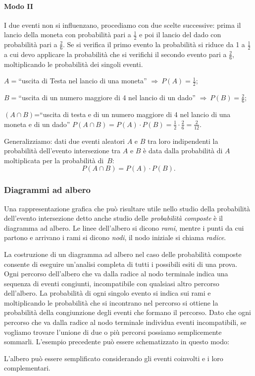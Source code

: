 \begin{exrig}
\begin{esempio}
\paragraph{Modo II} I due eventi non si influenzano, procediamo con due scelte successive: prima il lancio della moneta con probabilità pari a $\frac 1 2$ e poi il lancio del dado con probabilità pari a $\frac 2 6$. Se si verifica il primo evento la probabilità si riduce da 1 a $\frac 1 2$ a cui devo applicare la probabilità che si verifichi il secondo evento pari a $\frac 2 6$, moltiplicando le probabilità dei singoli eventi.
\begin{description*}
\item $A=$``uscita di Testa nel lancio di una moneta'' $\Rightarrow\: P(A)=\frac 1 2$;
\item $B=$``uscita di un numero maggiore di 4 nel lancio di un dado'' $\Rightarrow\: P(B)=\frac 2 6$;
\item $(A\cap B)$=``uscita di testa e di un numero maggiore di 4 nel lancio di una moneta e di un dado'' $P(A\cap B)=P(A)\cdot P(B)=\frac 1 2\cdot \frac 2 6=\frac 2{12}$.
\end{description*}
\end{esempio}
\end{exrig}

Generalizziamo: dati due eventi aleatori $A$ e $B$ tra loro indipendenti la probabilità dell'evento intersezione tra $A$ e $B$ è data dalla probabilità di $A$ moltiplicata per la probabilità di~$B$: \[P(A\cap B)=P(A)\cdot P(B).\]\label{reg:probabilita_intersezione_eventi_indipendenti}

\subsubsection*{Diagrammi ad albero}
Una rappresentazione grafica che può risultare utile nello studio della probabilità dell'evento intersezione detto anche studio delle \emph{probabilità composte} è il diagramma ad albero. Le linee dell'albero si dicono \emph{rami}, mentre i punti da cui partono e arrivano i rami si dicono \emph{nodi}, il nodo iniziale si chiama \emph{radice}.

La costruzione di un diagramma ad albero nel caso delle probabilità composte consente di eseguire un'analisi completa di tutti i possibili esiti di una prova. Ogni percorso dell'albero che va dalla radice al nodo terminale indica una sequenza di eventi congiunti, incompatibile con qualsiasi altro percorso dell'albero. La probabilità di ogni singolo evento si indica sui rami e moltiplicando le probabilità che si incontrano nel percorso si ottiene la probabilità della congiunzione degli eventi che formano il percorso. Dato che ogni percorso che va dalla radice al nodo terminale individua eventi incompatibili, se vogliamo trovare l'unione di due o più percorsi possiamo semplicemente sommarli.
L'esempio precedente può essere schematizzato in questo modo:
\begin{center}
 
\end{center}
L'albero può essere semplificato considerando gli eventi coinvolti e i loro complementari.

